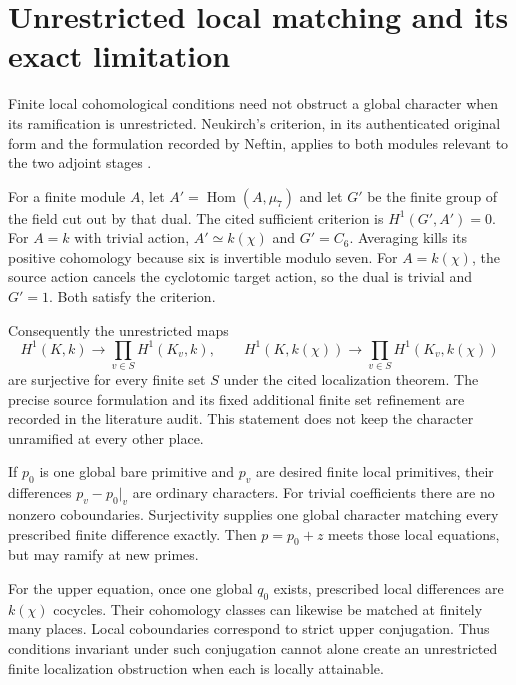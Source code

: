 \section{Unrestricted local matching and its exact limitation}\label{sec:flexibility}
Finite local cohomological conditions need not obstruct a global character when its ramification is unrestricted. Neukirch's criterion, in its authenticated original form and the formulation recorded by Neftin, applies to both modules relevant to the two adjoint stages \cite{neukirch1973,neftin2013}.

For a finite module $A$, let $A'=\operatorname{Hom}(A,\mu_7)$ and let $G'$ be the finite group of the field cut out by that dual. The cited sufficient criterion is $H^1(G',A')=0$. For $A=k$ with trivial action, $A'\simeq k(\chi)$ and $G'=C_6$. Averaging kills its positive cohomology because six is invertible modulo seven. For $A=k(\chi)$, the source action cancels the cyclotomic target action, so the dual is trivial and $G'=1$. Both satisfy the criterion.

Consequently the unrestricted maps
\[
H^1(K,k)\longrightarrow\prod_{v\in S}H^1(K_v,k),\qquad
H^1(K,k(\chi))\longrightarrow\prod_{v\in S}H^1(K_v,k(\chi))
\]
are surjective for every finite set $S$ under the cited localization theorem. The precise source formulation and its fixed additional finite set refinement are recorded in the literature audit. This statement does not keep the character unramified at every other place.

If $p_0$ is one global bare primitive and $p_v$ are desired finite local primitives, their differences $p_v-p_0|_v$ are ordinary characters. For trivial coefficients there are no nonzero coboundaries. Surjectivity supplies one global character matching every prescribed finite difference exactly. Then $p=p_0+z$ meets those local equations, but may ramify at new primes.

For the upper equation, once one global $q_0$ exists, prescribed local differences are $k(\chi)$ cocycles. Their cohomology classes can likewise be matched at finitely many places. Local coboundaries correspond to strict upper conjugation. Thus conditions invariant under such conjugation cannot alone create an unrestricted finite localization obstruction when each is locally attainable.


